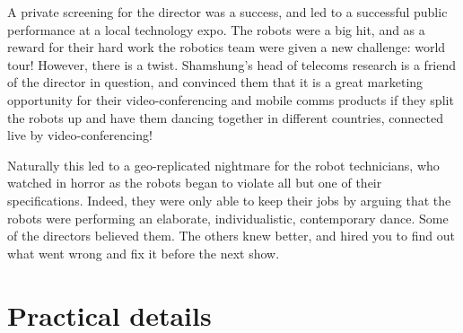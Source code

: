 \documentclass[a4paper]{article}
\begin{document}
A private screening for the director was a success, and led to a successful
public performance at a local technology expo. The robots were a big hit, and
as a reward for their hard work the robotics team were given a new challenge:
world tour! However, there is a twist. Shamshung's head of telecoms research
is a friend of the director in question, and convinced them that it is a great
marketing opportunity for their video-conferencing and mobile comms products
if they split the robots up and have them dancing together in different
countries, connected live by video-conferencing!

Naturally this led to a geo-replicated nightmare for the robot technicians,
who watched in horror as the robots began to violate all but one of their
specifications. Indeed, they were only able to keep their jobs by arguing that
the robots were performing an elaborate, individualistic, contemporary dance.
Some of the directors believed them. The others knew better, and hired you to
find out what went wrong and fix it before the next show.


%
%




\section*{Practical details} %
\label{sec:practical_details}
\end{document}
